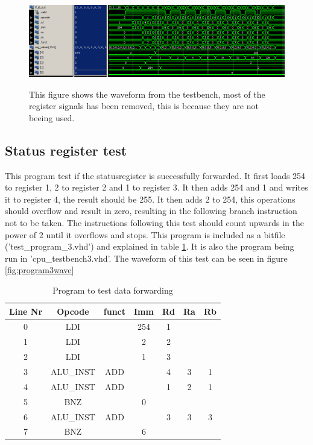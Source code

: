 \documentclass[11pt]{report}
\begin{document}
\begin{figure}
  \centering
  \includegraphics[width=.95\linewidth]{test3.png} \\
  \caption{This figure shows the waveform from the testbench, 
  most of the register signals has been removed, this is because they are not beeing used.}
  \label{fig:program2wave}
\end{figure}

\subsection*{Status register test}

This program test if the statusregister is successfully forwarded.
It first loads 254 to register 1, 2 to register 2 and 1 to register 3.
It then adds 254 and 1 and writes it to register 4, the result should be
255. It then adds 2 to 254, this operations should overflow and result in zero,
resulting in the following branch instruction not to be taken. The instructions
following this test should count upwards in the power of 2 until it overflows
and stops. This program is included as a bitfile ('test\_program\_3.vhd') and
explained in table \ref{tab:program3table}. It is also the program being run in 'cpu\_testbench3.vhd'.
The waveform of this test can be seen in figure \ref{fig:program3wave}

\begin{table}[htbp]
  \centering
  \begin{tabular}{|c|c|c|c|c|c|c|}
    \hline
    Line Nr &	Opcode		&	funct	&	Imm	&	Rd	&	Ra	&	Rb	\\\hline
    	0	&	LDI			&			&	254	&	1	&		&		\\\hline
    	1	&	LDI			&			&	2	&	2	&		&		\\\hline
    	2	&	LDI			&			&	1	&	3	&		&		\\\hline
    	3	&	ALU\_INST	&	ADD		&		&	4	&	3	&	1	\\\hline
    	4	&	ALU\_INST	&	ADD		&		&	1	&	2	&	1	\\\hline
    	5	&	BNZ			&			&	0	&		&		&		\\\hline
    	6	&	ALU\_INST	&	ADD		&		&	3	&	3	&	3	\\\hline
    	7	&	BNZ			&			&	6	&		&		&		\\\hline

  \end{tabular}
  \caption{Program to test data forwarding}
  \label{tab:program3table}
\end{table}
\end{document}
